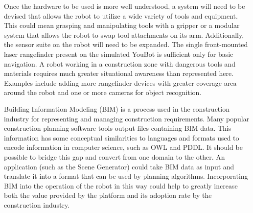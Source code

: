 Once the hardware to be used is more well understood, a system will need to be devised that allows the robot to utilize a wide variety of tools and equipment. This could mean grasping and manipulating tools with a gripper or a modular system that allows the robot to swap tool attachments on its arm. Additionally, the sensor suite on the robot will need to be expanded. The single front-mounted laser rangefinder present on the simulated YouBot is sufficient only for basic navigation. A robot working in a construction zone with dangerous tools and materials requires much greater situational awareness than represented here. Examples include adding more rangefinder devices with greater coverage area around the robot and one or more cameras for object recognition.

Building Information Modeling (BIM) is a process used in the construction industry for representing and managing construction requirements. Many popular construction planning software tools output files containing BIM data. This information has some conceptual similarities to languages and formats used to encode information in computer science, such as OWL and PDDL. It should be possible to bridge this gap and convert from one domain to the other. An application (such as the Scene Generator) could take BIM data as input and translate it into a format that can be used by planning algorithms. Incorporating BIM into the operation of the robot in this way could help to greatly increase both the value provided by the platform and its adoption rate by the construction industry.